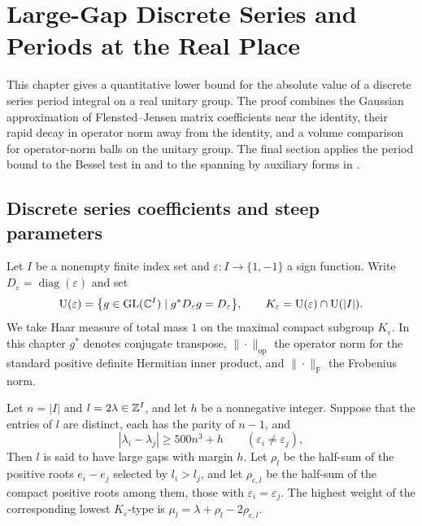 \chapter{Large-Gap Discrete Series and Periods at the Real Place}
\label{chap:discrete-series}
\label{chap:appendix-ds}

\begin{chapterguide}
This chapter gives a quantitative lower bound for the absolute value of a discrete series period integral on a real unitary group. The proof combines the Gaussian approximation of Flensted--Jensen matrix coefficients near the identity, their rapid decay in operator norm away from the identity, and a volume comparison for operator-norm balls on the unitary group. The final section applies the period bound to the Bessel test in  and to the spanning by auxiliary forms in .
\end{chapterguide}

\section{Discrete series coefficients and steep parameters}
\label{sec:ch8-steep-params}

Let $I$ be a nonempty finite index set and $\varepsilon\colon I\to\{1,-1\}$ a sign function. Write $D_\varepsilon=\operatorname{diag}(\varepsilon)$ and set
\[
\operatorname{U}(\varepsilon)=\bigl\{g\in\operatorname{GL}(\mathbb{C}^I)\mid g^*D_\varepsilon g=D_\varepsilon\bigr\},
\qquad
K_\varepsilon=\operatorname{U}(\varepsilon)\cap \operatorname{U}(|I|).
\]
We take Haar measure of total mass $1$ on the maximal compact subgroup $K_\varepsilon$. In this chapter $g^*$ denotes conjugate transpose, $\|\cdot\|_{\mathrm{op}}$ the operator norm for the standard positive definite Hermitian inner product, and $\|\cdot\|_{\mathrm F}$ the Frobenius norm.

\begin{definition}
\label{def:ch8-large-gap}
\emitthmsource
Let $n=|I|$ and $l=2\lambda\in\mathbb{Z}^I$, and let $h$ be a nonnegative integer. Suppose that the entries of $l$ are distinct, each has the parity of $n-1$, and
\[
 |\lambda_i-\lambda_j|\ge 500n^3+h
 \qquad(\varepsilon_i\ne\varepsilon_j),
\]
Then $l$ is said to have large gaps with margin $h$. Let $\rho_l$ be the half-sum of the positive roots $e_i-e_j$ selected by $l_i>l_j$, and let $\rho_{\mathrm c,l}$ be the half-sum of the compact positive roots among them, those with $\varepsilon_i=\varepsilon_j$. The highest weight of the corresponding lowest $K_\varepsilon$-type is $\mu_l=\lambda+\rho_l-2\rho_{\mathrm c,l}$.
\end{definition}

